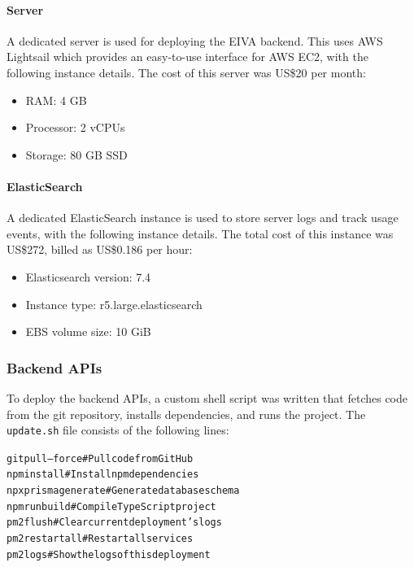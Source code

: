 \documentclass{article}
\begin{document}
\paragraph{Server}

A dedicated server is used for deploying the EIVA backend. This uses AWS Lightsail which provides an easy-to-use interface for AWS EC2, with the following instance details. The cost of this server was US\$20 per month:

\begin{itemize}
	\item RAM: 4 GB
	\item Processor: 2 vCPUs
	\item Storage: 80 GB SSD
\end{itemize}

\paragraph{ElasticSearch}

A dedicated ElasticSearch instance is used to store server logs and track usage events, with the following instance details. The total cost of this instance was US\$272, billed as US\$0.186 per hour:

\begin{itemize}
	\item Elasticsearch version: 7.4
	\item Instance type: r5.large.elasticsearch
	\item EBS volume size: 10 GiB
\end{itemize}

\subsubsection{Backend APIs}

To deploy the backend APIs, a custom shell script was written that fetches code from the git repository, installs dependencies, and runs the project. The \texttt{update.sh} file consists of the following lines:

\begin{alltt}
git pull --force \textcolor{comment}{# Pull code from GitHub}
npm install \textcolor{comment}{# Install npm dependencies}
npx prisma generate \textcolor{comment}{# Generate database schema}
npm run build \textcolor{comment}{# Compile TypeScript project}
pm2 flush \textcolor{comment}{# Clear current deployment's logs}
pm2 restart all \textcolor{comment}{# Restart all services}
pm2 logs \textcolor{comment}{# Show the logs of this deployment}
\end{alltt}
\end{document}
